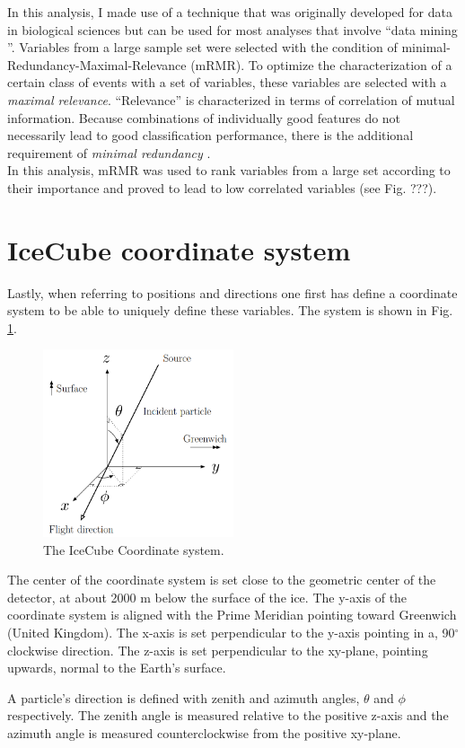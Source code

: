 In this analysis, I made use of a technique that was originally developed for data in biological sciences but can be used for most analyses that involve ``data mining ''. Variables from a large sample set were selected with the condition of minimal-Redundancy-Maximal-Relevance (mRMR). To optimize the characterization of a certain class of events with a set of variables, these variables are selected with a \textit{maximal relevance}. ``Relevance'' is characterized in terms of correlation of mutual information. Because combinations of individually good features do not necessarily lead to good classification performance, there is the additional requirement of \textit{minimal redundancy} \cite{1453511}.\\

\noindent In this analysis, mRMR was used to rank variables from a large set according to their importance and proved to lead to low correlated variables (see Fig. ???).

\section{IceCube coordinate system}
Lastly, when referring to positions and directions one first has define a coordinate system to be able to uniquely define these variables. The system is shown in Fig. \ref{fig:coordinates}.\\
\newline

\begin{figure}[t]
\centering
\includegraphics[width=0.5\textwidth]{chapter7/img/CoordinateSystem.png}
\caption{The IceCube Coordinate system.}
\label{fig:coordinates}
\end{figure}

\noindent The center of the coordinate system is set close to the geometric center of the detector, at about 2000 m below the surface of the ice. The y-axis of the coordinate system is aligned with the Prime Meridian pointing toward Greenwich (United Kingdom). The x-axis is set perpendicular to the y-axis pointing in a, 90$^\circ$ clockwise direction. The z-axis is set perpendicular to the xy-plane, pointing upwards, normal to the Earth's surface.

A particle's direction is defined with zenith and azimuth angles, $\theta$ and $\phi$ respectively. The zenith angle is measured relative to the positive z-axis and the azimuth angle is measured counterclockwise from the positive xy-plane.